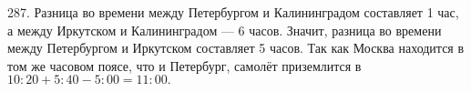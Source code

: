 287. Разница во времени между Петербургом и Калининградом составляет 1 час, а между Иркутском и Калининградом --- 6 часов. Значит, разница во времени между Петербургом и Иркутском составляет 5 часов. Так как Москва находится в том же часовом поясе, что и Петербург, самолёт приземлится в $10:20+5:40-5:00=11:00.$\\
